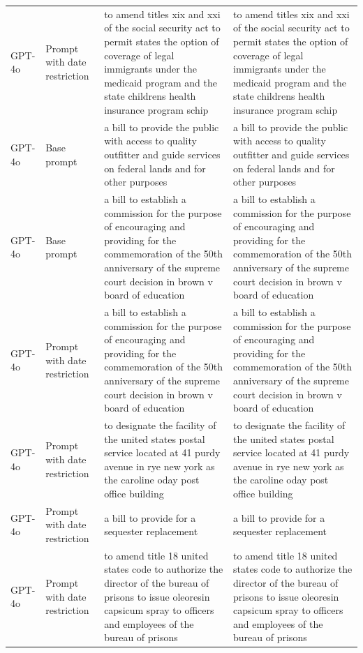 \begin{longtable}{>{\raggedright\arraybackslash}p{1.4cm}>{\raggedright\arraybackslash}p{1.4cm}>{\raggedright\arraybackslash}p{5.5cm}>{\raggedright\arraybackslash}p{5.5cm}}
GPT-4o & Prompt with date restriction & to amend titles xix and xxi of the social security act to permit states the option of coverage of legal immigrants under the medicaid program and the state childrens health insurance program schip & to amend titles xix and xxi of the social security act to permit states the option of coverage of legal immigrants under the medicaid program and the state childrens health insurance program schip\\
GPT-4o & Base prompt & a bill to provide the public with access to quality outfitter and guide services on federal lands and for other purposes & a bill to provide the public with access to quality outfitter and guide services on federal lands and for other purposes\\
GPT-4o & Base prompt & a bill to establish a commission for the purpose of encouraging and providing for the commemoration of the 50th anniversary of the supreme court decision in brown v board of education & a bill to establish a commission for the purpose of encouraging and providing for the commemoration of the 50th anniversary of the supreme court decision in brown v board of education\\
GPT-4o & Prompt with date restriction & a bill to establish a commission for the purpose of encouraging and providing for the commemoration of the 50th anniversary of the supreme court decision in brown v board of education & a bill to establish a commission for the purpose of encouraging and providing for the commemoration of the 50th anniversary of the supreme court decision in brown v board of education\\
GPT-4o & Prompt with date restriction & to designate the facility of the united states postal service located at 41 purdy avenue in rye new york as the caroline oday post office building & to designate the facility of the united states postal service located at 41 purdy avenue in rye new york as the caroline oday post office building\\
GPT-4o & Prompt with date restriction & a bill to provide for a sequester replacement & a bill to provide for a sequester replacement\\
GPT-4o & Prompt with date restriction & to amend title 18 united states code to authorize the director of the bureau of prisons to issue oleoresin capsicum spray to officers and employees of the bureau of prisons & to amend title 18 united states code to authorize the director of the bureau of prisons to issue oleoresin capsicum spray to officers and employees of the bureau of prisons\\

\end{longtable}
